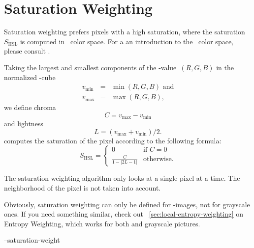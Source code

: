 

\section[Saturation Weighting]{\label{sec:saturation-weighting}%
  Saturation Weighting}

%
%
Saturation weighting prefers pixels with a high saturation, where the
saturation~$S_{\mathrm{HSL}}$ is computed in ~color space.  For a an introduction
to the ~color space, please consult .

Taking the largest and smallest components of the -value~$(R, G, B)$ in the
normalized -cube
\begin{eqnarray*}
  v_{\mathrm{min}} & = & \min(R, G, B) \mbox{ and} \\
  v_{\mathrm{max}} & = & \max(R, G, B),
\end{eqnarray*}
we define chroma
\[
  C = v_{\mathrm{max}} - v_{\mathrm{min}}
\]
and lightness
\[
  L = (v_{\mathrm{max}} + v_{\mathrm{min}}) / 2.
\]
\noindent \App{} computes the saturation of the pixel according to the following formula:
\begin{equation}\label{equ:saturationweight:hsl}
  S_{\mathrm{HSL}} =
  \left\{\begin{array}{cl}
  0                       & \mbox{if } C = 0 \\
  \frac{C}{1 - |2L - 1|}  & \mbox{otherwise.}
  \end{array}\right.
\end{equation}

The saturation weighting algorithm only looks at a single pixel at a time.  The neighborhood of
the pixel is not taken into account.

%
Obviously, saturation weighting can only be defined for -images, not for grayscale
ones.  If you need something similar, check out \sectionName~\ref{sec:local-entropy-weighting}
on Entropy Weighting, which works for both  and grayscale pictures.

\begin{optionsummary}
\item[--saturation-weight] \sectionName~
\end{optionsummary}


